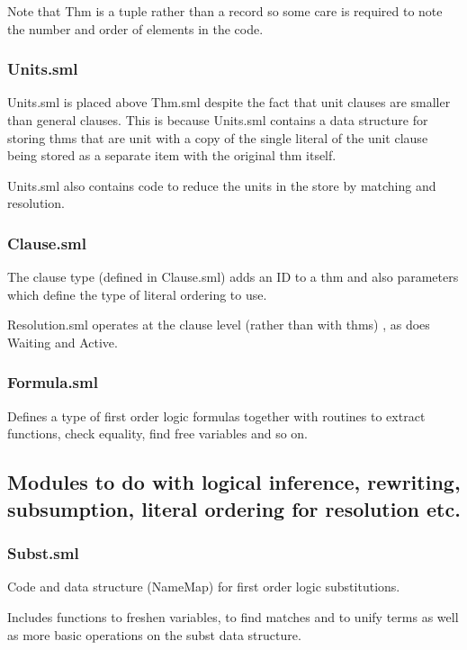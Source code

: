 \documentclass[11pt, oneside]{article}   	%
\begin{document}
Note that Thm is a tuple rather than a record so some care is required to note the number and order of elements in the code.

\subsubsection{Units.sml}

Units.sml is placed above Thm.sml despite the fact that unit clauses are smaller than general clauses. This is because Units.sml contains a  data structure for storing thms that are unit with a copy of the single literal of the unit clause being stored as a separate item with the original thm itself.

Units.sml also contains code to reduce the units in the store by matching and resolution.


\subsubsection{Clause.sml}

The clause type (defined in Clause.sml) adds an ID to a thm and also parameters which define the type of literal ordering to use.

Resolution.sml operates at the clause level (rather than with thms) , as does Waiting and Active.

\subsubsection{Formula.sml}

Defines a type of first order logic formulas together with routines to extract functions, check equality, find free variables and so on.

\subsection{Modules to do with logical inference, rewriting, subsumption, literal ordering for resolution etc.}

\subsubsection{Subst.sml}
Code and data structure (NameMap) for first order logic substitutions.

Includes functions to freshen variables, to find matches and to unify terms as well as more basic operations on the subst data structure.
\end{document}
